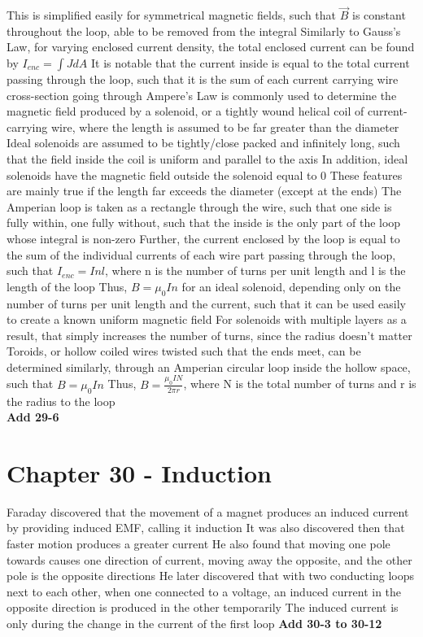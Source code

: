 \documentclass[11 pt, twoside]{article}
\newenvironment{outline*}
{
	\begin{outline}[enumerate]
	}
	{\end{outline}
}
\begin{document}
\begin{outline*}
\2 This is simplified easily for symmetrical magnetic fields, such that $\vec{B}$ is constant throughout the loop, able to be removed from the integral
\2 Similarly to Gauss's Law, for varying enclosed current density, the total enclosed current can be found by $I_{enc} = \int JdA$
\2 It is notable that the current inside is equal to the total current passing through the loop, such that it is the sum of each current carrying wire cross-section going through
\2 Ampere's Law is commonly used to determine the magnetic field produced by a solenoid, or a tightly wound helical coil of current-carrying wire, where the length is assumed to be far greater than the diameter
\3 Ideal solenoids are assumed to be tightly/close packed and infinitely long, such that the field inside the coil is uniform and parallel to the axis
\4 In addition, ideal solenoids have the magnetic field outside the solenoid equal to 0
\4 These features are mainly true if the length far exceeds the diameter (except at the ends)
\3 The Amperian loop is taken as a rectangle through the wire, such that one side is fully within, one fully without, such that the inside is the only part of the loop whose integral is non-zero
\4 Further, the current enclosed by the loop is equal to the sum of the individual currents of each wire part passing through the loop, such that $I_{enc} = Inl$, where n is the number of turns per unit length and l is the length of the loop
\4 Thus, $B = \mu_0In$ for an ideal solenoid, depending only on the number of turns per unit length and the current, such that it can be used easily to create a known uniform magnetic field
\4 For solenoids with multiple layers as a result, that simply increases the number of turns, since the radius doesn't matter
\3 Toroids, or hollow coiled wires twisted such that the ends meet, can be determined similarly, through an Amperian circular loop inside the hollow space, such that $B = \mu_0In$
\4 Thus, $B = \frac{\mu_0IN}{2\pi r}$, where N is the total number of turns and r is the radius to the loop
\1 \textbf{\\Add 29-6}
\end{outline*}
\section{Chapter 30 - Induction}
\begin{outline*}
\1 Faraday discovered that the movement of a magnet produces an induced current by providing induced EMF, calling it induction
\2 It was also discovered then that faster motion produces a greater current
\3 He also found that moving one pole towards causes one direction of current, moving away the opposite, and the other pole is the opposite directions
\2 He later discovered that with two conducting loops next to each other, when one connected to a voltage, an induced current in the opposite direction is produced in the other temporarily
\3 The induced current is only during the change in the current of the first loop
\1  
\1 \textbf{Add 30-3 to 30-12}
\end{outline*}
\end{document}
